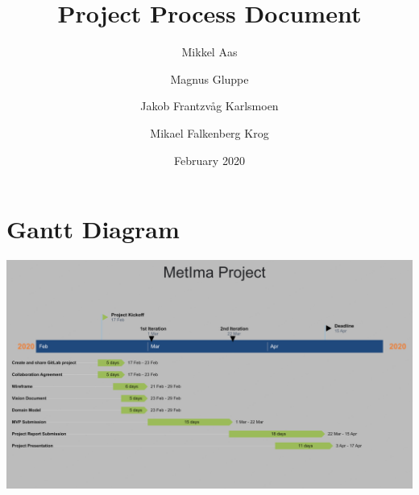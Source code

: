 \documentclass{article}
\title{Project Process Document}
\author{Mikkel Aas \and Magnus Gluppe \and Jakob Frantzvåg Karlsmoen \and Mikael Falkenberg Krog}
\date{February 2020}
\begin{document}
\maketitle

\section*{Gantt Diagram}
\includegraphics[width=\textwidth]{Gantt_Diagram.png}


\end{document}
